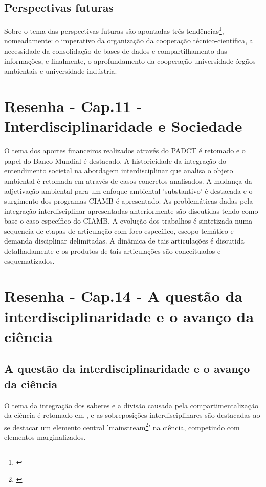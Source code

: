 \documentclass[
   article,       %
   12pt,          %
   oneside,       %
   a4paper,       %
   english,       %
   brazil,           %
   sumario=tradicional
   ]{abntex2}
\begin{document}
\subsection{Perspectivas futuras}

Sobre o tema das perspectivas futuras são apontadas três tendências\footnote{\cite[p.183]{modernas_Interdisciplinar}}, nomeadamente: o imperativo da organização da cooperação técnico-científica, a  necessidade da consolidação de bases de dados e compartilhamento das informações, e finalmente, o aprofundamento da cooperação universidade-órgãos ambientais e universidade-indústria.


\newpage

\section{Resenha - Cap.11 - Interdisciplinaridade e Sociedade}

O tema dos aportes financeiros realizados através do PADCT é retomado e o papel do Banco Mundial é destacado. A historicidade da integração do entendimento societal na abordagem interdisciplinar que analisa o objeto ambiental é retomada em \cite[p.190]{Interdisciplinaridade_Sociedade} através de casos concretos analisados. A mudança da adjetivação ambiental para um enfoque ambiental 'substantivo' é destacada e o surgimento dos programas CIAMB é apresentado. As problemáticas dadas pela integração interdisciplinar apresentadas anteriormente são discutidas tendo como base o caso específico do CIAMB. A evolução dos trabalhos é sintetizada numa sequencia de etapas de articulação com foco específico, escopo temático e demanda disciplinar delimitadas. A dinâmica de tais articulações é discutida detalhadamente e os produtos de tais articulações são conceituados e esquematizados.


\newpage

\section{Resenha - Cap.14 - A questão da interdisciplinaridade e o avanço da ciência}

\subsection{A questão da interdisciplinaridade e o avanço da ciência}


O tema da integração dos saberes e a divisão causada pela compartimentalização da ciência é retomado em \cite{Interdisciplinaridade_nucleos}, e as sobreposições interdisciplinares são destacadas ao se destacar um elemento central 'mainstream\footnote{\cite[p.247]{Interdisciplinaridade_nucleos}}' na ciência, competindo com elementos marginalizados.
\end{document}
